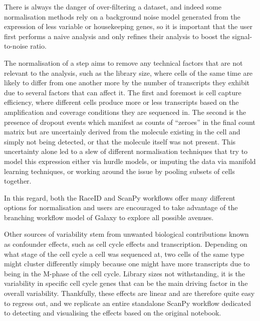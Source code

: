 \documentclass[a4paper,num-refs]{oup-contemporary}
\begin{document}
There is always the danger of over-filtering a dataset, and indeed some normalisation methods rely on a background noise model generated from the expression of less variable or housekeeping genes, so it is important that the user first performs a naive analysis and only refines their analysis to boost the signal-to-noise ratio.

The normalisation of a step aims to remove any technical factors that are not relevant to the analysis, such as the library size, where cells of the same time are likely to differ from one another more by the number of transcripts they exhibit due to several factors that can affect it. The first and foremost is cell capture efficiency, where different cells produce more or less transcripts based on the amplification and coverage conditions they are sequenced in. The second is the presence of dropout events which manifest as counts of ``zeroes'' in the final count matrix but are uncertainly derived from the molecule existing in the cell and simply not being detected, or that the molecule itself was not present. This uncertainty alone led to a slew of different normalisation techniques that try to model this expression either via hurdle models, or imputing the data via manifold learning techniques, or working around the issue by pooling subsets of cells together.

In this regard, both the RaceID and ScanPy workflows offer many different options for normalisation and users are encouraged to take advantage of the branching workflow model of Galaxy to explore all possible avenues.

Other sources of variability stem from unwanted biological contributions known as confounder effects, such as cell cycle effects and transcription. Depending on what stage of the cell cycle a cell was sequenced at, two cells of the same type might cluster differently simply because one might have more transcripts due to being in the M-phase of the cell cycle. Library sizes not withstanding, it is the variability in specific cell cycle genes that can be the main driving factor in the overall variability. Thankfully, these effects are linear and are therefore quite easy to regress out, and we replicate an entire standalone ScanPy workflow dedicated to detecting and visualising the effects based on the original notebook.
\end{document}
